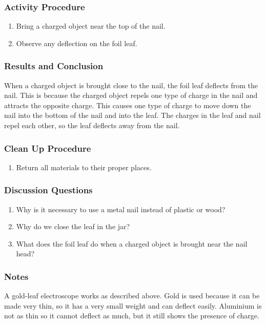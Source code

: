 \subsubsection*{Activity Procedure}
\begin{enumerate}
\item{Bring a charged object near the top of the nail.} 
\item{Observe any deflection on the foil leaf.} 
\end{enumerate}

\subsubsection*{Results and Conclusion}
When a charged object is brought close to the nail, the foil leaf deflects from the nail. This is because the charged object repels one type of charge in the nail and attracts the opposite charge. This causes one type of charge to move down the nail into the bottom of the nail and into the leaf. The charges in the leaf and nail repel each other, so the leaf deflects away from the nail.  

\subsubsection*{Clean Up Procedure}
\begin{enumerate}
\item{Return all materials to their proper places.} 
\end{enumerate}

\subsubsection*{Discussion Questions}
\begin{enumerate}
\item{Why is it necessary to use a metal nail instead of plastic or wood?}
\item{Why do we close the leaf in the jar?}
\item{What does the foil leaf do when a charged object is brought near the nail head?}
\end{enumerate}

\subsubsection*{Notes}
A gold-leaf electroscope works as described above. Gold is used because it can be made very thin, so it has a very small weight and can deflect easily. Aluminium is not as thin so it cannot deflect as much, but it still shows the presence of charge.  

